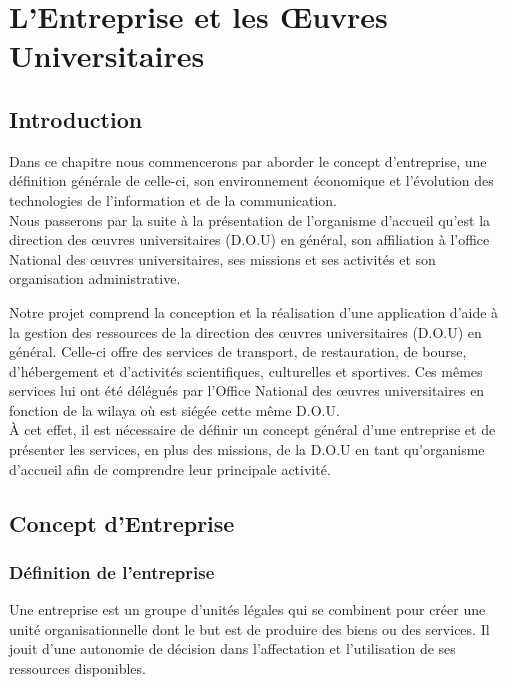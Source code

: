 \chapter{L'Entreprise et les Œuvres Universitaires}

\section{Introduction}
Dans ce chapitre nous commencerons par aborder le concept d'entreprise, une définition générale de celle-ci, son environnement économique et l'évolution des technologies de l'information et de la communication.\\

Nous passerons par la suite à la présentation de l'organisme d'accueil qu'est la direction des œuvres universitaires (D.O.U) en général, son affiliation à l'office National des œuvres universitaires, ses missions et ses activités et son organisation administrative. 


Notre projet comprend la conception et la réalisation d'une application d'aide à la gestion des ressources de la direction des œuvres universitaires (D.O.U) en général. Celle-ci offre des services de transport, de restauration, de bourse, d'hébergement et d'activités scientifiques, culturelles et sportives. Ces mêmes services lui ont été délégués par l'Office National des œuvres universitaires en fonction de la wilaya où est siégée cette même \acs{D.O.U}.\\

À cet effet, il est nécessaire de définir un concept général d'une entreprise et de  présenter les services, en plus des missions, de la \acs{D.O.U} en tant qu'organisme d'accueil afin de comprendre leur principale activité.\\

\section{Concept d’Entreprise}
\subsection{Définition de l’entreprise }
Une entreprise\cite{def-entreprise} est un groupe d'unités légales qui se combinent pour créer une unité organisationnelle dont le but est de produire des biens ou des services. Il jouit d'une autonomie de décision dans l'affectation et l'utilisation de ses ressources disponibles.\\


